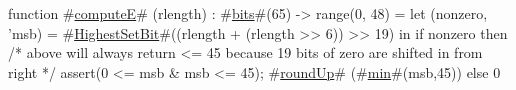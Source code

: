 function #\hyperref[zcomputeE]{computeE}# (rlength) : #\hyperref[zbits]{bits}#(65) -> range(0, 48) =
    let (nonzero, 'msb) = #\hyperref[zHighestSetBit]{HighestSetBit}#((rlength + (rlength >> 6)) >> 19) in
    if nonzero then 
      /* above will always return <= 45 because 19 bits of zero are shifted in from right */
      {assert(0 <= msb & msb <= 45); #\hyperref[zroundUp]{roundUp}# (#\hyperref[zmin]{min}#(msb,45)) }
    else 
      0
